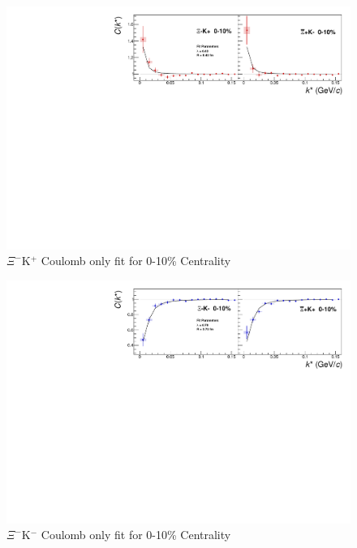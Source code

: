 \documentclass[../AnalysisNoteJBuxton.tex]{subfiles}
\begin{document}
\begin{figure}[h]
  \centering
  \includegraphics[width=\textwidth]{7_ResultsAndDiscussion/Figures/CoulombOnlyFitXiKchP_0010.pdf}
  \caption[$\Xi^{-}$K$^{+}$ Coulomb Only Fit]{$\Xi^{-}$K$^{+}$ Coulomb only fit for 0-10\% Centrality}
  \label{fig:XiKchPCoulombOnlyFit}
\end{figure}

\begin{figure}[h]
  \centering
  \includegraphics[width=\textwidth]{7_ResultsAndDiscussion/Figures/CoulombOnlyFitXiKchM_0010.pdf}
  \caption[$\Xi^{-}$K$^{-}$ Coulomb Only Fit]{$\Xi^{-}$K$^{-}$ Coulomb only fit for 0-10\% Centrality}
  \label{fig:XiKchMCoulombOnlyFit}
\end{figure}
\end{document}
